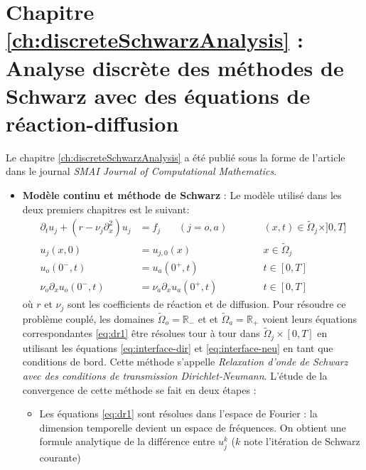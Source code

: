 \section*{Chapitre \ref{ch:discreteSchwarzAnalysis} : Analyse discrète des méthodes de Schwarz avec des équations de réaction-diffusion}
Le chapitre \ref{ch:discreteSchwarzAnalysis} a été publié sous la forme de l'article
\citep{clement_discrete_2022-1} dans le journal
\textit{SMAI Journal of Computational Mathematics}.
\begin{itemize}
\item \textbf{Modèle continu et méthode de Schwarz} :
Le modèle utilisé dans les deux premiers chapitres est le
suivant:
\begin{subequations}
\begin{align}
\partial_t u_j +( r - \nu_j \partial_x^2) u_j &= f_j ~~~~~~~~
(j=o,a) &\qquad&
	(x,t) \in \widetilde{\Omega}_j \times ]0,T] \label{eq:dr1} \\
u_j(x,0) &= u_{j,0}(x)   &\qquad&  x \in \widetilde{\Omega}_j  \\
u_o(0^-,t) &=  u_a(0^+,t) &\qquad& t \in [0,T] \label{eq:interface-dir} \\
\nu_o \partial_x u_o(0^-,t) &= \nu_a \partial_x u_a(0^+,t) &\qquad& t \in [0,T] \label{eq:interface-neu} 
\end{align}
\label{eq:resume_francais_model-problem}
\end{subequations}
où $r$ et $\nu_j$ sont les coefficients de réaction et de diffusion.
Pour résoudre ce problème couplé, les domaines
$\widetilde{\Omega}_o = \mathbb{R_{-}}$ et
et $\widetilde{\Omega}_a = \mathbb{R_{+}}$ voient leurs équations
correspondantes \eqref{eq:dr1} être résolues tour à tour
dans $\widetilde{\Omega}_j \times [0,T]$
en utilisant les équations
\eqref{eq:interface-dir} et \eqref{eq:interface-neu}
en tant que conditions de bord.
Cette méthode s'appelle \textit{Relaxation d'onde de Schwarz avec
des conditions de transmission Dirichlet-Neumann}.
L'étude de la convergence de cette méthode se fait en deux étapes :
\begin{itemize}
\item Les équations \eqref{eq:dr1} sont résolues dans l'espace de
	Fourier : la dimension temporelle devient un espace
	de fréquences. On obtient une formule analytique de
	la différence entre $u_j^k$
	($k$ note l'itération de Schwarz courante)

\end{itemize}
\end{itemize}
